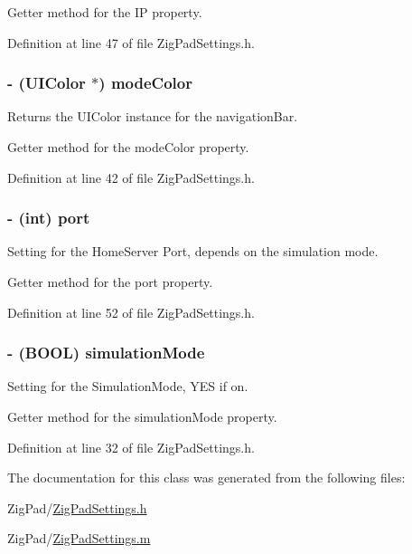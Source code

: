 Getter method for the IP property. 

Definition at line 47 of file ZigPadSettings.h.

\hypertarget{interface_zig_pad_settings_a22b7a43d44d562d77d8534e46db89fe1}{
\subsubsection[{modeColor}]{\setlength{\rightskip}{0pt plus 5cm}-\/ (UIColor $\ast$) modeColor}}
\label{interface_zig_pad_settings_a22b7a43d44d562d77d8534e46db89fe1}
Returns the UIColor instance for the navigationBar.

Getter method for the modeColor property. 

Definition at line 42 of file ZigPadSettings.h.

\hypertarget{interface_zig_pad_settings_a63c89c04d1feae07ca35558055155ffb}{
\subsubsection[{port}]{\setlength{\rightskip}{0pt plus 5cm}-\/ (int) port}}
\label{interface_zig_pad_settings_a63c89c04d1feae07ca35558055155ffb}
Setting for the HomeServer Port, depends on the simulation mode.

Getter method for the port property. 

Definition at line 52 of file ZigPadSettings.h.

\hypertarget{interface_zig_pad_settings_ab314ed8d97474bb5391236ced665bd3b}{
\subsubsection[{simulationMode}]{\setlength{\rightskip}{0pt plus 5cm}-\/ (BOOL) simulationMode}}
\label{interface_zig_pad_settings_ab314ed8d97474bb5391236ced665bd3b}
Setting for the SimulationMode, YES if on.

Getter method for the simulationMode property. 

Definition at line 32 of file ZigPadSettings.h.



The documentation for this class was generated from the following files:\begin{DoxyCompactItemize}
\item 
ZigPad/\hyperlink{_zig_pad_settings_8h}{ZigPadSettings.h}\item 
ZigPad/\hyperlink{_zig_pad_settings_8m}{ZigPadSettings.m}\end{DoxyCompactItemize}
